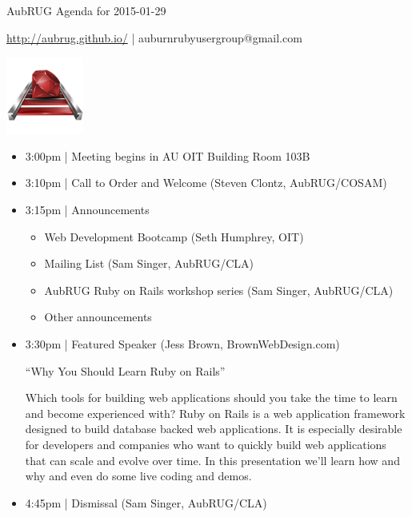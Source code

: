 \documentclass{article}
\begin{document}
\begin{center}
  {\huge AubRUG Agenda for 2015-01-29}

  \url{http://aubrug.github.io/} | auburnrubyusergroup@gmail.com

  \includegraphics[width=1in,height=1in]{ruby-on-rails-logo.png}
\end{center}

\begin{itemize}
  \item 3:00pm | Meeting begins in AU OIT Building Room 103B
  \item 3:10pm | Call to Order and Welcome (Steven Clontz, AubRUG/COSAM)
  \item 3:15pm | Announcements
    \begin{itemize}
      \item Web Development Bootcamp (Seth Humphrey, OIT)
      \item Mailing List (Sam Singer, AubRUG/CLA)
      \item AubRUG Ruby on Rails workshop series (Sam Singer, AubRUG/CLA)
      \item Other announcements
    \end{itemize}
  \item 3:30pm | Featured Speaker (Jess Brown, BrownWebDesign.com)

        ``Why You Should Learn Ruby on Rails''

          {\small
          Which tools for building web applications should you take the
          time to learn and become experienced with? Ruby on Rails is a web
          application framework designed to build database backed
          web applications. It is especially desirable for developers and
          companies who want to quickly build web applications that can scale
          and evolve over time. In this presentation we'll learn how and why
          and even do some live coding and demos.
          }

  \item 4:45pm | Dismissal (Sam Singer, AubRUG/CLA)
\end{itemize}
\end{document}
